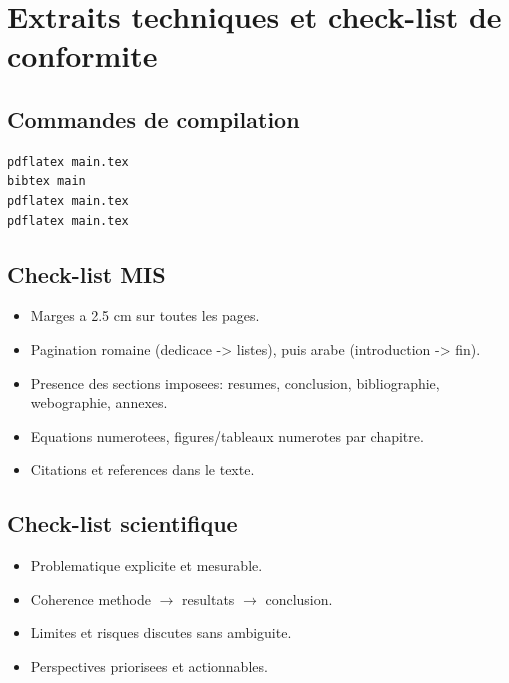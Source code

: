 \chapter{Extraits techniques et check-list de conformite}

\section{Commandes de compilation}
\begin{verbatim}
pdflatex main.tex
bibtex main
pdflatex main.tex
pdflatex main.tex
\end{verbatim}

\section{Check-list MIS}
\begin{itemize}
\item Marges a 2.5 cm sur toutes les pages.
\item Pagination romaine (dedicace -> listes), puis arabe (introduction -> fin).
\item Presence des sections imposees: resumes, conclusion, bibliographie,
webographie, annexes.
\item Equations numerotees, figures/tableaux numerotes par chapitre.
\item Citations et references dans le texte.
\end{itemize}

\section{Check-list scientifique}
\begin{itemize}
\item Problematique explicite et mesurable.
\item Coherence methode \(\rightarrow\) resultats \(\rightarrow\) conclusion.
\item Limites et risques discutes sans ambiguite.
\item Perspectives priorisees et actionnables.
\end{itemize}
